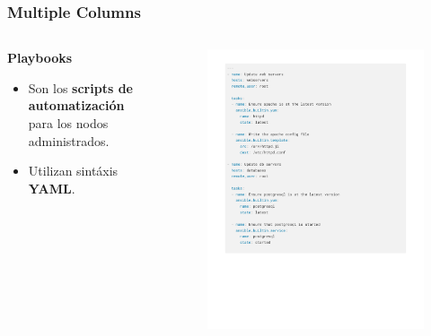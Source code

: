 \documentclass[
	11pt, %
]{beamer}
\begin{document}
\begin{frame}
	\frametitle{Multiple Columns}

	\begin{columns}[c]
		\begin{column}{0.45\textwidth}
			\textbf{Playbooks}
			\begin{itemize}
				\item Son los \textbf{scripts de automatización} para los nodos administrados.
				\item Utilizan sintáxis \textbf{YAML}.
			\end{itemize}
		\end{column}
		\begin{column}{0.5\textwidth}

			\begin{figure}
				\includegraphics[width=1.0\linewidth]{playbook.pdf}
			\end{figure}
		\end{column}
	\end{columns}
\end{frame}
\end{document}
